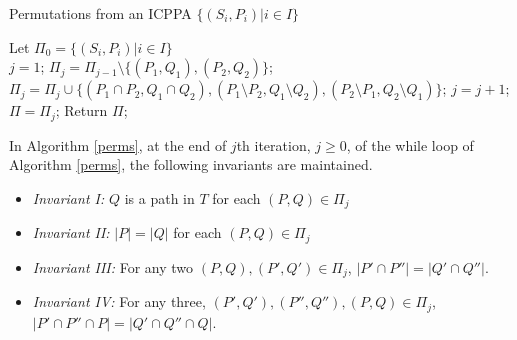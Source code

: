 \documentclass{llncs}
\begin{document}
\begin{algorithm}[h]
\caption{Permutations from an ICPPA $\{(S_i,P_i) | i \in I\}$}
\label{perms}
\begin{algorithmic}
\STATE Let $\Pi_0=\{(S_i,P_i)| i \in I\}$\\
\STATE $j = 1$;
\label{shareleaf} 
\STATE $\Pi_j=   \Pi_{j-1} \setminus \{(P_1,Q_1),(P_2,Q_2)\}$;
\label{setbreak}\STATE $\Pi_j = \Pi_j \cup \{(P_1 \cap P_2,Q_1 \cap Q_2), (P_1 \setminus P_2,Q_1 \setminus Q_2), (P_2 \setminus P_1, Q_2 \setminus Q_1)\}$;
\STATE $j = j+1$;
\ENDWHILE
\STATE $\Pi = \Pi_j$;
\STATE Return $\Pi$;
\end{algorithmic}
\end{algorithm}

\begin{lemma}
\label{lem:invar1}
  In Algorithm \ref{perms}, at the end of $j$th iteration, $j \ge 0$, of the while loop of 
  Algorithm \ref{perms}, the following invariants are maintained.
\begin{itemize}
\item {\em Invariant I:} $Q$ is a path in $T$ for each $(P,Q) \in
  \Pi_j$
\item {\em Invariant II:} $|P|=|Q|$ for each $(P,Q) \in \Pi_j$
\item {\em Invariant III:} For any two $(P,Q), (P',Q') \in \Pi_j$,
  $|P' \cap P''|=|Q' \cap Q''|$. 
\item {\em Invariant IV:} For any three, $(P',Q'), (P'',Q''),
  (P, Q) \in \Pi_j$,
  $|P' \cap P'' \cap P|=|Q' \cap Q'' \cap Q|$.
\end{itemize}
\end{lemma}
\end{document}
